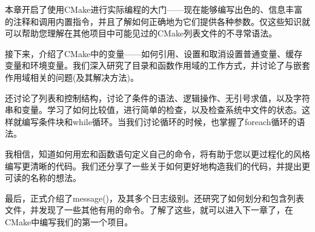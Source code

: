 本章开启了使用CMake进行实际编程的大门——现在能够编写出色的、信息丰富的注释和调用内置指令，并且了解如何正确地为它们提供各种参数。仅这些知识就可以帮助您理解在其他项目中可能见过的CMake列表文件的不寻常语法。

接下来，介绍了CMake中的变量——如何引用、设置和取消设置普通变量、缓存变量和环境变量。我们深入研究了目录和函数作用域的工作方式，并讨论了与嵌套作用域相关的问题(及其解决方法)。

还讨论了列表和控制结构，讨论了条件的语法、逻辑操作、无引号求值，以及字符串和变量。学习了如何比较值，进行简单的检查，以及检查系统中文件的状态。这样就编写条件块和while循环。当我们讨论循环的时候，也掌握了foreach循环的语法。

我相信，知道如何用宏和函数语句定义自己的命令，将有助于您以更过程化的风格编写更清晰的代码。我们还分享了一些关于如何更好地构造我们的代码，并提出更可读的名称的想法。

最后，正式介绍了message()，及其多个日志级别。还研究了如何划分和包含列表文件，并发现了一些其他有用的命令。了解了这些，就可以进入下一章了，在CMake中编写我们的第一个项目。